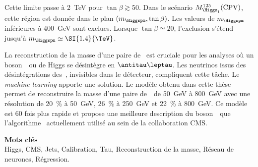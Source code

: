 Cette limite passe à
\SI{2}{\TeV} pour $\tan\beta\gtrsim\num{50}$.
Dans le scénario $M_{\Higgs_1}^{125}(\text{CPV})$,
cette région est donnée dans le plan $(m_{\Higgspm},\tan\beta)$.
Les valeurs de $m_{\Higgspm}$ inférieures à \SI{400}{\GeV} sont exclues.
Lorsque
$\tan\beta\simeq\num{20}$,
l'exclusion s'étend jusqu'à
$m_{\Higgspm} \simeq \SI{1.4}{\TeV}$.
\par
La reconstruction de la masse d'une paire de \tau\
est cruciale pour les analyses
où un boson~\Zboson\ ou de Higgs se désintègre en $\antitau\leptau$.
Les neutrinos issus des désintégrations des~\tau, invisibles dans le détecteur, compliquent cette tâche.
Le \emph{machine learning} apporte une solution.
Le modèle obtenu dans cette thèse permet
de reconstruire la masse d'une paire de~\tau\
de \SI{50}{\GeV} à \SI{800}{\GeV}
avec une résolution de
\SI{20}{\%} à \SI{50}{\GeV},
\SI{26}{\%} à \SI{250}{\GeV} et
\SI{22}{\%} à \SI{800}{\GeV}.
Ce modèle est
60 fois plus rapide
et propose une meilleure description du boson~\Zboson\
que l'algorithme \SVFIT\ actuellement utilisé au sein de la collaboration CMS.

\vfill

\noindent\textbf{\Large\sffamily Mots clés}\\
Higgs,
CMS,
Jets,
Calibration,
Tau,
Reconstruction de la masse,
Réseau de neurones,
Régression.

\vspace{2\baselineskip}